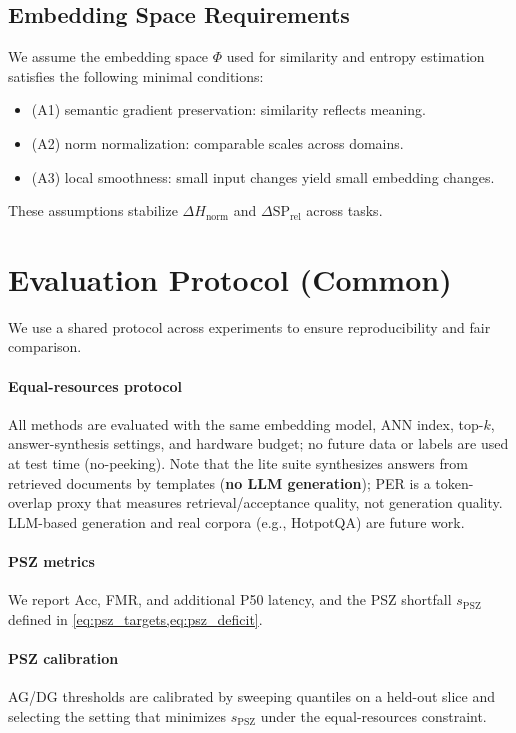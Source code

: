\documentclass[12pt]{article}
\begin{document}
\subsection{Embedding Space Requirements}
\label{sec:phi_requirements}
We assume the embedding space $\Phi$ used for similarity and entropy estimation satisfies the following minimal conditions:
\begin{itemize}[leftmargin=*]
  \item (A1) semantic gradient preservation: similarity reflects meaning.
  \item (A2) norm normalization: comparable scales across domains.
  \item (A3) local smoothness: small input changes yield small embedding changes.
\end{itemize}
These assumptions stabilize $\Delta H_{\mathrm{norm}}$ and $\Delta \mathrm{SP}_{\mathrm{rel}}$ across tasks.


\section{Evaluation Protocol (Common)}
\label{sec:eval_protocol}
We use a shared protocol across experiments to ensure reproducibility and fair comparison.
\paragraph{Equal-resources protocol}\label{sec:equal_resources}
All methods are evaluated with the same embedding model, ANN index, top-$k$, answer-synthesis settings, and hardware budget; no future data or labels are used at test time (no-peeking). Note that the lite suite synthesizes answers from retrieved documents by templates (\textbf{no LLM generation}); PER is a token-overlap proxy that measures retrieval/acceptance quality, not generation quality. LLM-based generation and real corpora (e.g., HotpotQA) are future work.
\paragraph{PSZ metrics}\label{sec:psz_metrics}
We report Acc, FMR, and additional P50 latency, and the PSZ shortfall $s_{\mathrm{PSZ}}$ defined in \cref{eq:psz_targets,eq:psz_deficit}.
\paragraph{PSZ calibration}\label{sec:psz_calibration}
AG/DG thresholds are calibrated by sweeping quantiles on a held-out slice and selecting the setting that minimizes $s_{\mathrm{PSZ}}$ under the equal-resources constraint.
\end{document}
